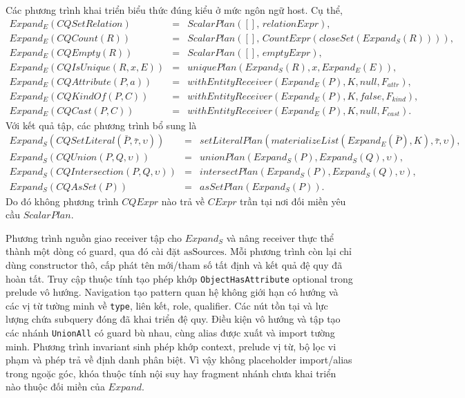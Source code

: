\documentclass[11pt,a4paper]{article}
\theoremstyle{definition}
\newcommand{\asSources}{\mathrm{asSources}}
\begin{document}
Các phương trình khai triển biểu thức đúng kiểu ở mức ngôn ngữ host. Cụ thể,
\[
\begin{array}{rcl}
Expand_E(CQSetRelation)&=&ScalarPlan([],\,relationExpr),\\
Expand_E(CQCount(R))&=&ScalarPlan([],\,CountExpr(closeSet(Expand_S(R)))),\\
Expand_E(CQEmpty(R))&=&ScalarPlan([],\,emptyExpr),\\
Expand_E(CQIsUnique(R,x,E))&=&uniquePlan(Expand_S(R),x,Expand_E(E)),\\
Expand_E(CQAttribute(P,a))&=&withEntityReceiver(Expand_E(P),K,null,F_{attr}),\\
Expand_E(CQKindOf(P,C))&=&withEntityReceiver(Expand_E(P),K,false,F_{kind}),\\
Expand_E(CQCast(P,C))&=&withEntityReceiver(Expand_E(P),K,null,F_{cast}).
\end{array}
\]
Với kết quả tập, các phương trình bổ sung là
\[
\begin{array}{rcl}
Expand_S(CQSetLiteral(\bar P,\bar\tau,\upsilon))
 &=&setLiteralPlan(materializeList(Expand_E(\bar P),K),\bar\tau,\upsilon),\\
Expand_S(CQUnion(P,Q,\upsilon))
 &=&unionPlan(Expand_S(P),Expand_S(Q),\upsilon),\\
Expand_S(CQIntersection(P,Q,\upsilon))
 &=&intersectPlan(Expand_S(P),Expand_S(Q),\upsilon),\\
Expand_S(CQAsSet(P))&=&asSetPlan(Expand_S(P)).
\end{array}
\]
Do đó không phương trình $CQExpr$ nào trả về $CExpr$ trần tại nơi đối miền yêu
cầu $ScalarPlan$.

Phương trình nguồn giao receiver tập cho $Expand_S$ và nâng receiver thực thể
thành một dòng có guard, qua đó cài đặt $\asSources$. Mỗi phương trình còn lại
chỉ dùng constructor thô, cấp phát tên mới/tham số tất định và kết quả đệ quy đã
hoàn tất. Truy cập thuộc tính tạo phép khớp \texttt{ObjectHasAttribute}
optional trong prelude vô hướng. Navigation tạo pattern quan hệ không giới hạn
có hướng và các vị từ tường minh về \texttt{type}, liên kết, role, qualifier.
Các nút tồn tại và lực lượng chứa subquery đóng đã khai triển đệ quy. Điều kiện
vô hướng và tập tạo các nhánh \texttt{UnionAll} có guard bù nhau, cùng alias
được xuất và import tường minh. Phương trình invariant sinh phép khớp context,
prelude vị từ, bộ lọc vi phạm và phép trả về định danh phân biệt. Vì vậy không
placeholder import/alias trong ngoặc góc, khóa thuộc tính nội suy hay fragment
nhánh chưa khai triển nào thuộc đối miền của $Expand$.
\end{document}
